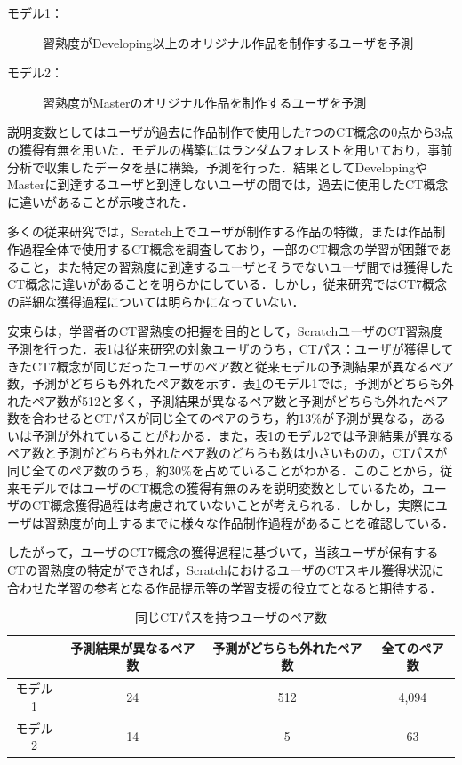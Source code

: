 \documentclass[11pt,dvipdfmx]{jreport}
\begin{document}
\begin{description}
\item [モデル1：]習熟度がDeveloping以上のオリジナル作品を制作するユーザを予測
\item [モデル2：]習熟度がMasterのオリジナル作品を制作するユーザを予測
\end{description}

説明変数としてはユーザが過去に作品制作で使用した7つのCT概念の0点から3点の獲得有無を用いた．モデルの構築にはランダムフォレストを用いており，事前分析で収集したデータを基に構築，予測を行った．結果としてDevelopingやMasterに到達するユーザと到達しないユーザの間では，過去に使用したCT概念に違いがあることが示唆された．

多くの従来研究では，Scratch上でユーザが制作する作品の特徴，または作品制作過程全体で使用するCT概念を調査しており，一部のCT概念の学習が困難であること，また特定の習熟度に到達するユーザとそうでないユーザ間では獲得したCT概念に違いがあることを明らかにしている．しかし，従来研究ではCT7概念の詳細な獲得過程については明らかになっていない．

安東らは，学習者のCT習熟度の把握を目的として，ScratchユーザのCT習熟度予測を行った．表\ref{tab:same-path}は従来研究\cite{Ando_2021}の対象ユーザのうち，CTパス：ユーザが獲得してきたCT7概念が同じだったユーザのペア数と従来モデルの予測結果が異なるペア数，予測がどちらも外れたペア数を示す．表\ref{tab:same-path}のモデル1では，予測がどちらも外れたペア数が512と多く，予測結果が異なるペア数と予測がどちらも外れたペア数を合わせるとCTパスが同じ全てのペアのうち，約13\%が予測が異なる，あるいは予測が外れていることがわかる．また，表\ref{tab:same-path}のモデル2では予測結果が異なるペア数と予測がどちらも外れたペア数のどちらも数は小さいものの，CTパスが同じ全てのペア数のうち，約30\%を占めていることがわかる．このことから，従来モデルではユーザのCT概念の獲得有無のみを説明変数としているため，ユーザのCT概念獲得過程は考慮されていないことが考えられる．しかし，実際にユーザは習熟度が向上するまでに様々な作品制作過程があることを確認している．

したがって，ユーザのCT7概念の獲得過程に基づいて，当該ユーザが保有するCTの習熟度の特定ができれば，ScratchにおけるユーザのCTスキル獲得状況に合わせた学習の参考となる作品提示等の学習支援の役立てとなると期待する．

\begin{table}
  \caption{同じCTパスを持つユーザのペア数}
  \label{tab:same-path}
  \vspace{2mm}
  \centering
  \begin{tabular}{c|c|c|c}
    \hline
     & 予測結果が異なるペア数 & 予測がどちらも外れたペア数 & 全てのペア数\\
    \hline
    \hline
    モデル1 & 24 & 512 & 4,094 \\
    \hline
    モデル2 & 14 & 5 & 63 \\
    \hline
  \end{tabular}
\end{table}
\end{document}
